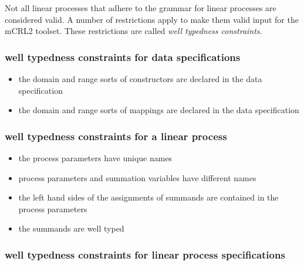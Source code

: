 \documentclass{article}
\begin{document}
Not all linear processes that adhere to the grammar for linear processes are
considered valid. A number of restrictions apply to make them valid input
for the mCRL2 toolset. These restrictions are called \emph{well typedness
constraints}.

\subsubsection{well typedness constraints for data specifications}

\begin{itemize}
\item the domain and range sorts of constructors are declared in the data
specification

\item the domain and range sorts of mappings are declared in the data
specification
\end{itemize}

\subsubsection{well typedness constraints for a linear process}

\begin{itemize}
\item the process parameters have unique names

\item process parameters and summation variables have different names

\item the left hand sides of the assignments of summands are contained in
the process parameters

\item the summands are well typed
\end{itemize}

\subsubsection{well typedness constraints for linear process specifications}
\end{document}

